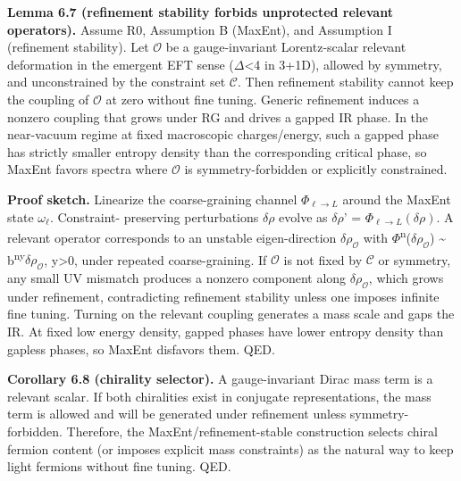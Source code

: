 \documentclass[11pt,a4paper]{article}
\theoremstyle{remark}
\begin{document}
\textbf{Lemma 6.7 (refinement stability forbids unprotected relevant operators).}
Assume R0, Assumption B (MaxEnt), and Assumption I (refinement stability).
Let \ensuremath{\mathcal{O}} be a gauge-invariant Lorentz-scalar relevant deformation
in the emergent EFT sense (\ensuremath{\Delta}\textless4 in 3+1D), allowed by symmetry,
and unconstrained by the constraint set \ensuremath{\mathcal{C}}. Then refinement stability
cannot keep the coupling of \ensuremath{\mathcal{O}} at zero without fine tuning.
Generic refinement induces a nonzero coupling that grows under RG and
drives a gapped IR phase. In the near-vacuum regime at fixed macroscopic
charges/energy, such a gapped phase has strictly smaller entropy density
than the corresponding critical phase, so MaxEnt favors spectra where
\ensuremath{\mathcal{O}} is symmetry-forbidden or explicitly constrained.

\textbf{Proof sketch.} Linearize the coarse-graining channel
\(\ensuremath{\Phi}_{\ensuremath{\ell}\ensuremath{\to}L}\) around the MaxEnt state \(\ensuremath{\omega}_\ensuremath{\ell}\). Constraint-
preserving perturbations \ensuremath{\delta}\ensuremath{\rho} evolve as
\ensuremath{\delta}\ensuremath{\rho}' = \(\ensuremath{\Phi}_{\ensuremath{\ell}\ensuremath{\to}L}(\ensuremath{\delta}\ensuremath{\rho})\). A relevant operator corresponds
to an unstable eigen-direction \(\ensuremath{\delta}\ensuremath{\rho}_\ensuremath{\mathcal{O}}\) with
\textbar \ensuremath{\Phi}\textsuperscript{n}(\(\ensuremath{\delta}\ensuremath{\rho}_\ensuremath{\mathcal{O}}\))\textbar{} \textasciitilde{} b\textsuperscript{n}\textsuperscript{y}\textbar{}\(\ensuremath{\delta}\ensuremath{\rho}_\ensuremath{\mathcal{O}}\)\textbar,
y\textgreater0, under repeated coarse-graining. If \ensuremath{\mathcal{O}} is not fixed by
\ensuremath{\mathcal{C}} or symmetry, any small UV mismatch produces a nonzero
component along \(\ensuremath{\delta}\ensuremath{\rho}_\ensuremath{\mathcal{O}}\), which grows under refinement,
contradicting refinement stability unless one imposes infinite fine tuning.
Turning on the relevant coupling generates a mass scale and gaps the IR.
At fixed low energy density, gapped phases have lower entropy density than
gapless phases, so MaxEnt disfavors them. QED.

\textbf{Corollary 6.8 (chirality selector).} A gauge-invariant Dirac mass term is
a relevant scalar. If both chiralities exist in conjugate representations,
the mass term is allowed and will be generated under refinement unless
symmetry-forbidden. Therefore, the MaxEnt/refinement-stable construction
selects chiral fermion content (or imposes explicit mass constraints) as the
natural way to keep light fermions without fine tuning. QED.
\end{document}
